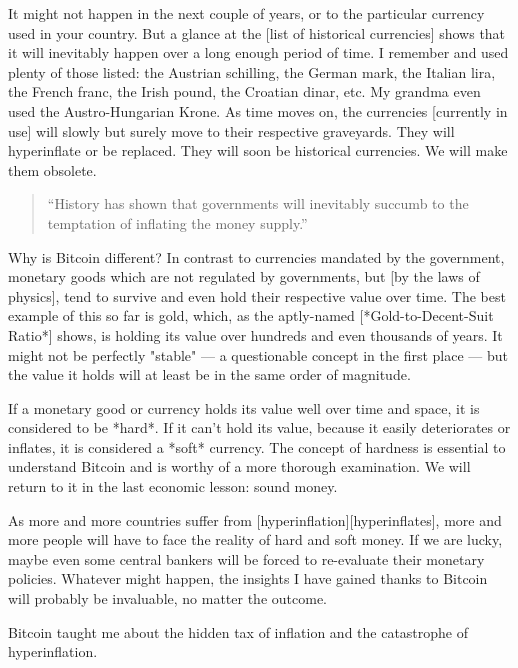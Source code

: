 It might not happen in the next couple of years, or to the particular
currency used in your country. But a glance at the [list of historical
currencies] shows that it will inevitably happen over a long enough period of
time. I remember and used plenty of those listed: the Austrian
schilling, the German mark, the Italian lira, the French franc, the
Irish pound, the Croatian dinar, etc. My grandma even used the
Austro-Hungarian Krone. As time moves on, the currencies [currently in
use] will slowly but surely move to their respective graveyards. They
will hyperinflate or be replaced. They will soon be historical
currencies. We will make them obsolete.

\begin{quotation}
``History has shown that governments will inevitably succumb to the
temptation of inflating the money supply.''
\end{quotation}

Why is Bitcoin different? In contrast to currencies mandated by the
government, monetary goods which are not regulated by governments, but
[by the laws of physics], tend to survive and even hold their respective
value over time. The best example of this so far is gold, which, as the
aptly-named [*Gold-to-Decent-Suit Ratio*] shows, is holding its value
over hundreds and even thousands of years. It might not be perfectly
"stable" --- a questionable concept in the first place --- but the value
it holds will at least be in the same order of magnitude.

If a monetary good or currency holds its value well over time and space,
it is considered to be *hard*. If it can't hold its value, because it
easily deteriorates or inflates, it is considered a *soft* currency. The
concept of hardness is essential to understand Bitcoin and is worthy of
a more thorough examination. We will return to it in the last economic
lesson: sound money.

As more and more countries suffer from [hyperinflation][hyperinflates],
more and more people will have to face the reality of hard and soft
money. If we are lucky, maybe even some central bankers will be forced
to re-evaluate their monetary policies. Whatever might happen, the
insights I have gained thanks to Bitcoin will probably be invaluable, no
matter the outcome.

Bitcoin taught me about the hidden tax of inflation and the catastrophe
of hyperinflation.

